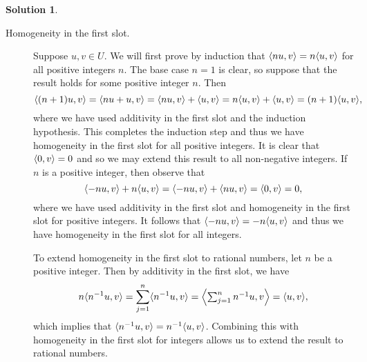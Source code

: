 \documentclass[12pt]{article}
\theoremstyle{definition}
\theoremstyle{exercise}
\theoremstyle{solution}
\newtheorem*{solution}{Solution}
\DeclarePairedDelimiter\ip{\langle}{\rangle}
\begin{document}
\begin{solution}
\begin{description}
        \item[Homogeneity in the first slot.] Suppose \( u, v \in U \). We will first prove by induction that \( \ip{nu, v} = n \ip{u, v} \) for all positive integers \( n \). The base case \( n = 1 \) is clear, so suppose that the result holds for some positive integer \( n \). Then
        \[
            \ip{(n + 1)u, v} = \ip{nu + u, v} = \ip{nu, v} + \ip{u, v} = n \ip{u, v} + \ip{u, v} = (n + 1) \ip{u, v},
        \]
        where we have used additivity in the first slot and the induction hypothesis. This completes the induction step and thus we have homogeneity in the first slot for all positive integers. It is clear that \( \ip{0, v} = 0 \) and so we may extend this result to all non-negative integers. If \( n \) is a positive integer, then observe that
        \[
            \ip{-nu, v} + n \ip{u, v} = \ip{-nu, v} + \ip{nu, v} = \ip{0, v} = 0,
        \]
        where we have used additivity in the first slot and homogeneity in the first slot for positive integers. It follows that \( \ip{-nu, v} = -n \ip{u, v} \) and thus we have homogeneity in the first slot for all integers.
    
        To extend homogeneity in the first slot to rational numbers, let \( n \) be a positive integer. Then by additivity in the first slot, we have
        \[
            n \ip{n^{-1} u, v} = \sum_{j=1}^n \ip{n^{-1} u, v} = \ip*{\textstyle{\sum_{j=1}^n n^{-1} u, v}} = \ip{u, v},
        \]
        which implies that \( \ip{n^{-1} u, v} = n^{-1} \ip{u, v} \). Combining this with homogeneity in the first slot for integers allows us to extend the result to rational numbers.
    

\end{description}
\end{solution}
\end{document}

